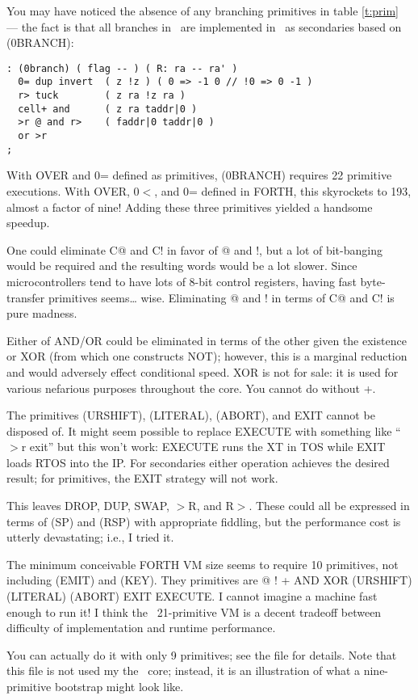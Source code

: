 \documentclass{article}
\begin{document}
You may have noticed the absence of any branching primitives in
table \ref{t:prim} --- the fact is that all branches in \M\ are
implemented in \M\ as secondaries based on (0BRANCH):
\begin{verbatim}
: (0branch) ( flag -- ) ( R: ra -- ra' )
  0= dup invert  ( z !z ) ( 0 => -1 0 // !0 => 0 -1 )
  r> tuck        ( z ra !z ra )
  cell+ and      ( z ra taddr|0 )
  >r @ and r>    ( faddr|0 taddr|0 )
  or >r
;
\end{verbatim}
With OVER and 0= defined as primitives, (0BRANCH) requires 22
primitive executions. With OVER, 0$<$, and 0= defined in FORTH, this
skyrockets to 193, almost a factor of nine! Adding these three
primitives yielded a handsome speedup.

One could eliminate C@ and C! in favor of @ and !, but a lot of
bit-banging would be required and the resulting words would be a lot
slower. Since microcontrollers tend to have lots of 8-bit control
registers, having fast byte-transfer primitives seems\ldots
wise. Eliminating @ and ! in terms of C@ and C! is pure madness.

Either of AND/OR could be eliminated in terms of the other given the
existence or XOR (from which one constructs NOT); however, this is a
marginal reduction and would adversely effect conditional speed. XOR is
not for sale: it is used for various nefarious purposes throughout
the core. You cannot do without +.

The primitives (URSHIFT), (LITERAL), (ABORT), and EXIT cannot be
disposed of. It might seem possible to replace EXECUTE with something
like ``$>$r exit'' but this won't work: EXECUTE runs the XT in TOS
while EXIT loads RTOS into the IP. For secondaries either operation
achieves the desired result; for primitives, the EXIT strategy will not
work.

This leaves DROP, DUP, SWAP, $>$R, and R$>$. These could all be
expressed in terms of (SP) and (RSP) with appropriate fiddling, but
the performance cost is utterly devastating; i.e., I tried it.

The minimum conceivable FORTH VM size seems to require 10 primitives,
not including (EMIT) and (KEY). They primitives are @ ! + AND XOR
(URSHIFT) (LITERAL) (ABORT) EXIT EXECUTE. I cannot imagine a machine
fast enough to run it! I think the \M\ 21-primitive VM is a decent
tradeoff between difficulty of implementation and runtime performance.

You can actually do it with only 9 primitives; see the file
 for details. Note that this file is not used my the
\M\ core; instead, it is an illustration of what a nine-primitive
bootstrap might look like.
\end{document}

